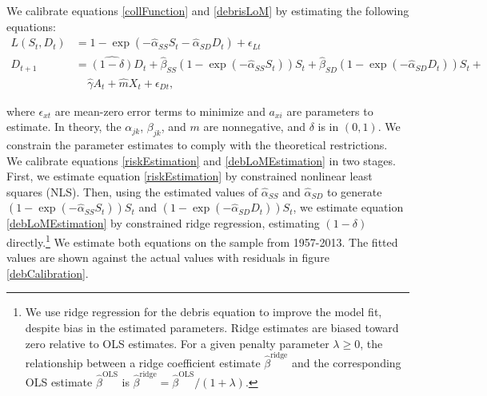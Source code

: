 \documentclass[12pt]{article}
\begin{document}
We calibrate equations \ref{collFunction} and \ref{debrisLoM} by estimating the following equations:
\begin{align}
\label{riskEstimation}
L(S_t,D_t) &= 1 - \exp(-\hat{\alpha}_{SS} S_t-\hat{\alpha}_{SD} D_t) + \epsilon_{L t}  \\
\label{debLoMEstimation}
D_{t+1} &= \hat{(1-\delta)} D_t + \hat{\beta}_{SS} (1-\exp(-\hat{\alpha}_{SS}S_t))S_t + \hat{\beta}_{SD} (1-\exp(-\hat{\alpha}_{SD}D_t))S_t + \\
&~~~~~  \hat{\gamma} A_t + \hat{m} X_t + \epsilon_{D t},
\end{align}

where $\epsilon_{xt}$ are mean-zero error terms to minimize and $a_{xi}$ are parameters to estimate. In theory, the $\alpha_{jk}$, $\beta_{jk}$, and $m$ are nonnegative, and $\delta$ is in $(0,1)$. We constrain the parameter estimates to comply with the theoretical restrictions.\\

We calibrate equations \ref{riskEstimation} and \ref{debLoMEstimation} in two stages. First, we estimate equation \ref{riskEstimation} by constrained nonlinear least squares (NLS). Then, using the estimated values of $\hat{\alpha}_{SS}$ and $\hat{\alpha}_{SD}$ to generate $(1-\exp(-\hat{\alpha}_{SS}S_t))S_t$ and $(1-\exp(-\hat{\alpha}_{SD}D_t))S_t$, we estimate equation \ref{debLoMEstimation} by constrained ridge regression, estimating $(1-\delta)$ directly.\footnote{We use ridge regression for the debris equation to improve the model fit, despite bias in the estimated parameters. Ridge estimates are biased toward zero relative to OLS estimates. For a given penalty parameter $\lambda \geq 0$, the relationship between a ridge coefficient estimate $\hat{\beta}^{\text{ridge}}$ and the corresponding OLS estimate $\hat{\beta}^{\text{OLS}}$ is $\hat{\beta}^{\text{ridge}} = \hat{\beta}^{\text{OLS}}/(1+\lambda)$.} We estimate both equations on the sample from 1957-2013. The fitted values are shown against the actual values with residuals in figure \ref{debCalibration}.
\end{document}
